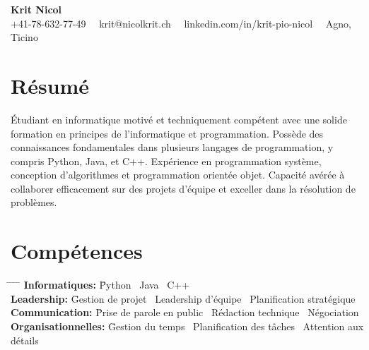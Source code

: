 \documentclass[a4paper,11pt]{article}  %
\begin{document}
\begin{center}
    {\fontsize{18pt}{22pt}\selectfont \textbf{Krit Nicol}} \\
    \vspace{0.2in}
    +41-78-632-77-49 \, \textbullet \, krit@nicolkrit.ch \, \textbullet \, linkedin.com/in/krit-pio-nicol \, \textbullet \, Agno, Ticino \\
\end{center}

\vspace{0.2in}

\section*{Résumé}
Étudiant en informatique motivé et techniquement compétent avec une solide formation en principes de l'informatique et programmation. 
Possède des connaissances fondamentales dans plusieurs langages de programmation, y compris Python, Java, et C++. 
Expérience en programmation système, conception d'algorithmes et programmation orientée objet. 
Capacité avérée à collaborer efficacement sur des projets d'équipe et exceller dans la résolution de problèmes. 
\vspace{0.2in}

\section*{Compétences}
\begin{tabbing}
    \hspace{1in} \= \hspace{1in} \= \hspace{1in} \= \hspace{1in} \= \kill
    \textbf{Informatiques:} \= Python \textbullet \, Java \textbullet \, C++ \\
    \textbf{Leadership:} \= Gestion de projet \textbullet \, Leadership d'équipe \textbullet \, Planification stratégique \\
    \textbf{Communication:} \= Prise de parole en public \textbullet \, Rédaction technique \textbullet \, Négociation \\
    \textbf{Organisationnelles:} \= Gestion du temps \textbullet \, Planification des tâches \textbullet \, Attention aux détails \\
\end{tabbing}
\end{document}
